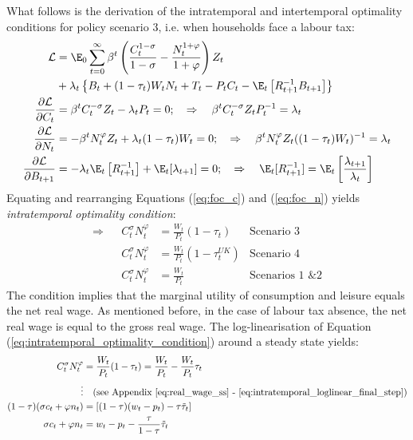 What follows is the derivation of the intratemporal and intertemporal optimality conditions for policy scenario 3, i.e. when households face a labour tax:
\begin{align}
 \mathcal{L} & = \E_0 \sum^{\infty}_{t=0} \beta^t \left( \frac{C_t^{1-\sigma}}{1-\sigma} - \frac{N_t^{1+\varphi}}{1+\varphi} \right)Z_t \nonumber \\ &+ \lambda_t\left\{ B_t + (1-\tau_t) W_t N_t + T_t - P_t C_t - \E_t \left[R^{-1}_{t+1}B_{t+1} \right] \right\}\\
 \frac{\partial \mathcal{L}}{\partial C_t} & = \beta^t C_t^{-\sigma}Z_t - \lambda_t P_t = 0; \quad \Rightarrow \quad \beta^t C_t^{-\sigma}Z_t P_{t}^{-1} = \lambda_t \label{eq:foc_c} \\
 \frac{\partial \mathcal{L}}{\partial N_t} & = -\beta^t N_t^{\varphi}Z_t + \lambda_t (1-\tau_t) W_t = 0; \quad \Rightarrow \quad \beta^t N_t^{\varphi} Z_t ((1-\tau_t)W_{t})^{-1} = \lambda_t \label{eq:foc_n} \\
 \frac{\partial \mathcal{L}}{\partial B_{t+1}} & = -\lambda_t \E_t \left[ R^{-1}_{t+1} \right] + \E_t[\lambda_{t+1}] = 0; \quad \Rightarrow \quad \E_t[R^{-1}_{t+1}] = \E_t \left[\frac{\lambda_{t+1}}{\lambda_t}\right] \label{eq:foc_b}
\end{align}
Equating and rearranging Equations (\ref{eq:foc_c}) and (\ref{eq:foc_n}) yields \textit{intratemporal optimality condition}:
\begin{align}
 \Rightarrow & & C_t^{\sigma} N_t^{\varphi} &= \frac{W_t}{P_t}(1-\tau_t) \label{eq:intratemporal_optimality_condition} & \text{Scenario 3} \\
 & & C_t^{\sigma} N_t^{\varphi} &= \frac{W_t}{P_t}(1-\tau^{UK}_t) & \text{Scenario 4} \\
 & & C_t^{\sigma} N_t^{\varphi} &= \frac{W_t}{P_t} & \text{Scenarios 1 \& 2}
\end{align}
The condition implies that the marginal utility of consumption and leisure equals the net real wage. As mentioned before, in the case of labour tax absence, the net real wage is equal to the gross real wage. The log-linearisation of Equation (\ref{eq:intratemporal_optimality_condition}) around a steady state yields:
\begin{align}
 C_t^\sigma N_t^\varphi &= \frac{W_t}{P_t}(1-\tau_t) = \frac{W_t}{P_t} - \frac{W_t}{P_t}\tau_t \nonumber\\
 \vdots & \quad \text{(see Appendix \ref{eq:real_wage_ss} - \ref{eq:intratemporal_loglinear_final_step})}\nonumber\\
 (1-\tau)({\sigma c_t + \varphi n_t}) &= \left[(1-\tau)({w_t - p_t}) - \tau \tilde{\tau}_t\right]\nonumber\\
 {\sigma c_t + \varphi n_t} &= {w_t - p_t} - \frac{\tau}{1-\tau}\tilde{\tau}_t
\end{align}
